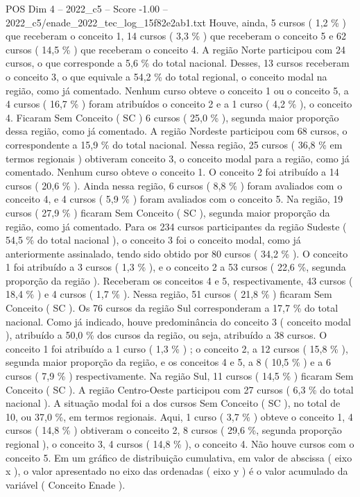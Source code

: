 \begin{textsample}{POS Dim 4 – 2022\_c5 – Score -1.00 – 2022\_c5/enade\_2022\_tec\_log\_15f82e2ab1.txt}
Houve, ainda, 5 cursos ( 1,2 \% ) que receberam o conceito 1, 14 cursos ( 3,3 \% ) que receberam o conceito 5 e 62 cursos ( 14,5 \% ) que receberam o conceito 4.
A região Norte participou com 24 cursos, o que corresponde a 5,6 \% do total nacional.
Desses, 13 cursos receberam o conceito 3, o que equivale a 54,2 \% do total regional, o conceito modal na região, como já comentado.
Nenhum curso obteve o conceito 1 ou o conceito 5, a 4 cursos ( 16,7 \% ) foram atribuídos o conceito 2 e a 1 curso ( 4,2 \% ), o conceito 4.
Ficaram Sem Conceito ( SC ) 6 cursos ( 25,0 \% ), segunda maior proporção dessa região, como já comentado.
A região Nordeste participou com 68 cursos, o correspondente a 15,9 \% do total nacional.
Nessa região, 25 cursos ( 36,8 \% em termos regionais ) obtiveram conceito 3, o conceito modal para a região, como já comentado.
Nenhum curso obteve o conceito 1.
O conceito 2 foi atribuído a 14 cursos ( 20,6 \% ).
Ainda nessa região, 6 cursos ( 8,8 \% ) foram avaliados com o conceito 4, e 4 cursos ( 5,9 \% ) foram avaliados com o conceito 5.
Na região, 19 cursos ( 27,9 \% ) ficaram Sem Conceito ( SC ), segunda maior proporção da região, como já comentado.
Para os 234 cursos participantes da região Sudeste ( 54,5 \% do total nacional ), o conceito 3 foi o conceito modal, como já anteriormente assinalado, tendo sido obtido por 80 cursos ( 34,2 \% ).
O conceito 1 foi atribuído a 3 cursos ( 1,3 \% ), e o conceito 2 a 53 cursos ( 22,6 \%, segunda proporção da região ).
Receberam os conceitos 4 e 5, respectivamente, 43 cursos ( 18,4 \% ) e 4 cursos ( 1,7 \% ).
Nessa região, 51 cursos ( 21,8 \% ) ficaram Sem Conceito ( SC ).
Os 76 cursos da região Sul corresponderam a 17,7 \% do total nacional.
Como já indicado, houve predominância do conceito 3 ( conceito modal ), atribuído a 50,0 \% dos cursos da região, ou seja, atribuído a 38 cursos.
O conceito 1 foi atribuído a 1 curso ( 1,3 \% ) ; o conceito 2, a 12 cursos ( 15,8 \% ), segunda maior proporção da região, e os conceitos 4 e 5, a 8 ( 10,5 \% ) e a 6 cursos ( 7,9 \% ) respectivamente.
Na região Sul, 11 cursos ( 14,5 \% ) ficaram Sem Conceito ( SC ).
A região Centro-Oeste participou com 27 cursos ( 6,3 \% do total nacional ).
A situação modal foi a dos cursos Sem Conceito ( SC ), no total de 10, ou 37,0 \%, em termos regionais.
Aqui, 1 curso ( 3,7 \% ) obteve o conceito 1, 4 cursos ( 14,8 \% ) obtiveram o conceito 2, 8 cursos ( 29,6 \%, segunda proporção regional ), o conceito 3, 4 cursos ( 14,8 \% ), o conceito 4.
Não houve cursos com o conceito 5.
Em um gráfico de distribuição cumulativa, em valor de abscissa ( eixo x ), o valor apresentado no eixo das ordenadas ( eixo y ) é o valor acumulado da variável ( Conceito Enade ).

\end{textsample}
